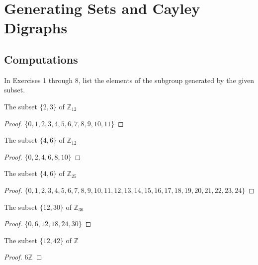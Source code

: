 \newpage
\section{Generating Sets and Cayley Digraphs}

\subsection*{Computations}

In Exercises 1 through 8, list the elements of the subgroup generated by the given subset.

\newpage
\begin{exercise}
    The subset $\{ 2, 3 \}$ of $\mathbb{Z}_{12}$
\end{exercise}

\begin{proof}
    $\{ 0, 1, 2, 3, 4, 5, 6, 7, 8, 9, 10, 11 \}$
\end{proof}

\newpage
\begin{exercise}
    The subset $\{ 4, 6 \}$ of $\mathbb{Z}_{12}$
\end{exercise}

\begin{proof}
    $\{ 0, 2, 4, 6, 8, 10 \}$
\end{proof}

\newpage
\begin{exercise}
    The subset $\{ 4, 6 \}$ of $\mathbb{Z}_{25}$
\end{exercise}

\begin{proof}
    $\{ 0, 1, 2, 3, 4, 5, 6, 7, 8, 9, 10, 11, 12, 13, 14, 15, 16, 17, 18, 19, 20, 21, 22, 23, 24 \}$
\end{proof}

\newpage
\begin{exercise}
    The subset $\{ 12, 30 \}$ of $\mathbb{Z}_{36}$
\end{exercise}

\begin{proof}
    $\{ 0, 6, 12, 18, 24, 30 \}$
\end{proof}

\newpage
\begin{exercise}
    The subset $\{ 12, 42 \}$ of $\mathbb{Z}$
\end{exercise}

\begin{proof}
    $6\mathbb{Z}$
\end{proof}

